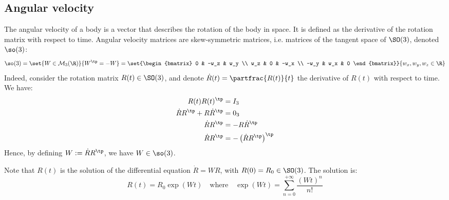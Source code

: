 \subsection{Angular velocity}
The angular velocity of a body is a vector that describes the rotation of the body in space. It is defined as the derivative of the rotation matrix with respect to time. Angular velocity matrices are skew-symmetric matrices, i.e. matrices of the tangent space of $\SO(3)$, denoted $\so(3)$:
\begin{equation*}
    \so(3) = \set{W\in\mathcal{M}_3(\R)}{W^\tp=-W} = \set{\begin{bmatrix}
        0 & -w_z & w_y \\
        w_z & 0 & -w_x \\
        -w_y & w_x & 0
    \end{bmatrix}}{w_x, w_y, w_z\in\R}
\end{equation*}
Indeed, consider the rotation matrix $R(t)\in\SO(3)$, and denote $\dot R(t) = \partfrac{R(t)}{t}$ the derivative of $R(t)$ with respect to time. We have:
\begin{align*}
    R(t)R(t)^\tp &= I_3 \\
    \dot RR^\tp + R\dot R^\tp &= 0_3 \\
    \dot RR^\tp &= -R\dot R^\tp \\
    \dot RR^\tp &= -\left(\dot RR^\tp\right)^\tp \\
\end{align*}
Hence, by defining $W := \dot RR^\tp$, we have $W\in\so(3)$.

Note that $R(t)$ is the solution of the differential equation $\dot R = WR$, with $R(0)=R_0\in\SO(3)$. The solution is:
\begin{equation*}
    R(t) = R_0\exp(Wt) \quad\text{where}\quad \exp(Wt) = \sum_{n=0}^{+\infty}\frac{(Wt)^n}{n!}
\end{equation*}